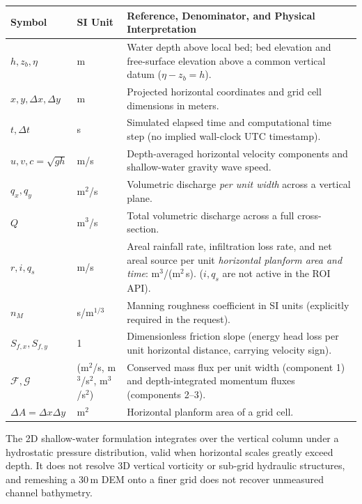 \documentclass[11pt,a4paper]{article}
\begin{document}
\begin{longtable}{p{.18\linewidth}p{.17\linewidth}p{.57\linewidth}}
\toprule Symbol & SI Unit & Reference, Denominator, and Physical Interpretation\\\midrule\endhead
$h,z_b,\eta$ & m & Water depth above local bed; bed elevation and free-surface elevation above a common vertical datum ($\eta-z_b=h$).\\
$x,y,\Delta x,\Delta y$ & m & Projected horizontal coordinates and grid cell dimensions in meters.\\
$t,\Delta t$ & s & Simulated elapsed time and computational time step (no implied wall-clock UTC timestamp).\\
$u,v,c=\sqrt{gh}$ & m/s & Depth-averaged horizontal velocity components and shallow-water gravity wave speed.\\
$q_x,q_y$ & m$^2$/s & Volumetric discharge \emph{per unit width} across a vertical plane.\\
$Q$ & m$^3$/s & Total volumetric discharge across a full cross-section.\\
$r,i,q_s$ & m/s & Areal rainfall rate, infiltration loss rate, and net areal source per unit \emph{horizontal planform area and time}: m$^3$/(m$^2$\,s). ($i,q_s$ are not active in the ROI API).\\
$n_M$ & s/m$^{1/3}$ & Manning roughness coefficient in SI units (explicitly required in the request).\\
$S_{f,x},S_{f,y}$ & 1 & Dimensionless friction slope (energy head loss per unit horizontal distance, carrying velocity sign).\\
$\mathcal F,\mathcal G$ & (m$^2$/s, m$^3$/s$^2$, m$^3$/s$^2$) & Conserved mass flux per unit width (component 1) and depth-integrated momentum fluxes (components 2--3).\\
$\Delta A=\Delta x\Delta y$ & m$^2$ & Horizontal planform area of a grid cell.\\\bottomrule
\end{longtable}

The 2D shallow-water formulation integrates over the vertical column under a hydrostatic pressure distribution, valid when horizontal scales greatly exceed depth. It does not resolve 3D vertical vorticity or sub-grid hydraulic structures, and remeshing a 30\,m DEM onto a finer grid does not recover unmeasured channel bathymetry.
\end{document}
